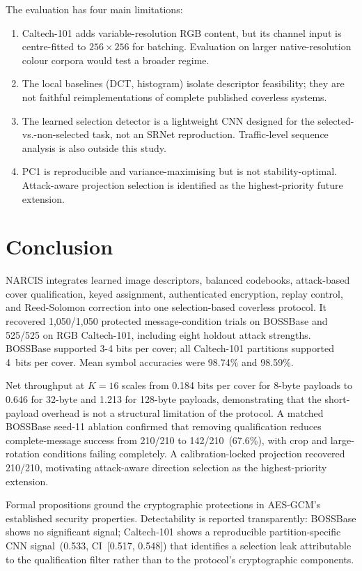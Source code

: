\documentclass[10pt,journal]{IEEEtran}
\newcommand{\method}{NARCIS\xspace}
\begin{document}
The evaluation has four main limitations:
\begin{enumerate}
\item Caltech-101 adds variable-resolution RGB content, but its channel
input is centre-fitted to $256\times256$ for batching. Evaluation on
larger native-resolution colour corpora would test a broader regime.
\item The local baselines (DCT, histogram) isolate descriptor feasibility;
they are not faithful reimplementations of complete published coverless
systems.
\item The learned selection detector is a lightweight CNN designed for
the selected-vs.-non-selected task, not an SRNet reproduction.
Traffic-level sequence analysis is also outside this study.
\item PC1 is reproducible and variance-maximising but is not stability-optimal.
Attack-aware projection selection is identified as the highest-priority
future extension.
\end{enumerate}

\section{Conclusion}
\label{sec:conclusion}

\method integrates learned image descriptors, balanced codebooks,
attack-based cover qualification, keyed assignment, authenticated
encryption, replay control, and Reed-Solomon correction into one
selection-based coverless protocol. It recovered 1{,}050/1{,}050
protected message-condition trials on BOSSBase and 525/525 on RGB
Caltech-101, including eight holdout attack strengths. BOSSBase
supported 3-4 bits per cover; all Caltech-101 partitions supported
4~bits per cover. Mean symbol accuracies were 98.74\% and 98.59\%.

Net throughput at $K{=}16$ scales from 0.184 bits per cover for
8-byte payloads to 0.646 for 32-byte and 1.213 for 128-byte payloads,
demonstrating that the short-payload overhead is not a structural
limitation of the protocol. A matched BOSSBase seed-11 ablation
confirmed that removing qualification reduces complete-message success
from 210/210 to 142/210~(67.6\%), with crop and large-rotation
conditions failing completely. A calibration-locked projection recovered
210/210, motivating attack-aware direction selection as the
highest-priority extension.

Formal propositions ground the cryptographic protections in AES-GCM's
established security properties. Detectability is reported
transparently: BOSSBase shows no significant signal; Caltech-101 shows
a reproducible partition-specific CNN signal~(0.533, CI~[0.517,
0.548]) that identifies a selection leak attributable to the
qualification filter rather than to the protocol's cryptographic
components.
\end{document}
